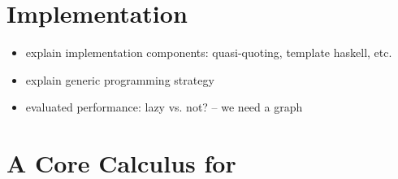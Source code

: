 \documentclass[nocopyrightspace,natbib]{sigplanconf}
\begin{document}


\section{Implementation}

\begin{itemize}
\item explain implementation components: quasi-quoting, template haskell, etc.
\item explain generic programming strategy
\item evaluated performance: lazy vs. not? -- we need a graph
\end{itemize}

\section{A Core Calculus for \forest{}}
\label{sec:exp}
\renewcommand{\bnfdef}{\ensuremath{\mathord{::=}}}
\newcommand{\slsh}{\ensuremath{\mathord{\textsf{/}}}}
\newcommand{\File}[1]{\ensuremath{\mathsf{File}(#1)}}
\newcommand{\Dir}[1]{\ensuremath{\mathsf{Dir}(#1)}}
\newcommand{\Link}[1]{\ensuremath{\mathsf{Link}(#1)}}
\newcommand{\Set}[1]{\ensuremath{\{ #1 \}}}
\newcommand{\Map}[1]{\ensuremath{\{\!\mid #1 \mid\!\}}}
\newcommand{\PNil}{\ensuremath{\bullet}}
\newcommand{\PCons}[2]{\ensuremath{#1\,\textsf{/}\,#2}}
\newcommand{\Just}[1]{\ensuremath{\mathsf{Just(#1)}}}
\newcommand{\Nothing}{\ensuremath{\mathsf{Nothing}}}
\newcommand{\True}{\ensuremath{\mathsf{True}}}
\newcommand{\False}{\ensuremath{\mathsf{False}}}
\newcommand{\fn}[2]{\ensuremath{#1(#2)}}
\newcommand{\Sk}{k^{\tau_m}_{\tau_r}}
\newcommand{\SAdhoc}[1]{\ensuremath{\mathsf{Adhoc}({#1}^{\tau_m}_{\tau_r})}}
\newcommand{\SPred}[1]{\ensuremath{\mathsf{Pred}(#1)}}
\newcommand{\SPath}[2]{\ensuremath{#1 \mathrel{::} #2}}
\newcommand{\SPair}[3]{\ensuremath{\langle #1 {:} #2, #3 \rangle}}
\newcommand{\SOption}[1]{\ensuremath{#1?}}
\newcommand{\SSetComp}[3]{\ensuremath{\{ #1 \mid #2 \in #3 \}}}
\newcommand{\Env}{\ensuremath{\mathcal{E}}}
\newcommand{\ENil}{\ensuremath{\bullet}}
\newcommand{\yields}{\ensuremath{\rightsquigarrow}}
\newcommand{\valid}[1]{\ensuremath{\mathit{valid}(#1)}}
\newcommand{\typ}[1]{\ensuremath{\mathit{#1}}}
\newcommand{\meta}{\typ{meta}}
\newcommand{\REP}{\ensuremath{\mathit{REP}}}
\newcommand{\PD}{\ensuremath{\mathit{PD}}}
\newcommand{\pd}[1]{\ensuremath{(#1)~\mathit{pd}}}
\newcommand{\eval}[1]{\ensuremath{\mathsf{eval}(#1)}}
\newcommand{\ptext}{\ensuremath{\mathsf{Txt}}}
\newcommand{\pbin}{\ensuremath{\mathsf{Bin}}}
\newcommand{\pany}{\ensuremath{\mathsf{Any}}}
\newcommand{\att}{\ensuremath{\mathsf{a}}}
\newcommand{\defaultatt}{\ensuremath{\att_{\mathsf{df}}}}
\newcommand{\repty}[1]{{\cal R}[\![ #1 ]\!]}
\newcommand{\mdty}[1]{{\cal M}[\![ #1 ]\!]}
\newcommand{\checkk}[3]{\fn{\mathit{check}}{#1,#2,#3}}
\end{document}
